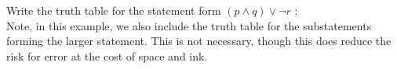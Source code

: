 \guard







\begin{exmp}
  Write the truth table for the statement form $(p\wedge q) \vee \neg r$ :\\
  Note, in this example, we also include the truth table for the substatements forming the larger statement.
  This is not necessary, though this does reduce the risk for error at the cost of space and ink.
  \begin{center}
    
  \end{center}
\end{exmp}
